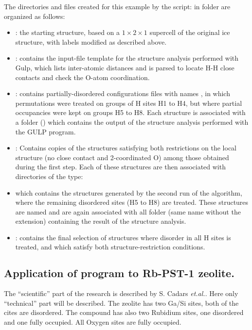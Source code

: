\documentclass[a4paper,10pt]{article}
\begin{document}
The directories and files created for this example by the script:  in folder  are organized as follows:
\begin{itemize}
 \item {}: the starting structure, based on a $1\times2\times1$ supercell of the original ice  structure, with labels modified as described above.
 \item {}: contains the input-file template for the structure analysis performed with Gulp, which lists inter-atomic distances and is parsed to locate H-H close contacts and check the O-atom coordination.
 \item {}: contains partially-disordered configurations files with names , in which permutations were treated on groups of H sites H1 to H4, but where partial occupancies were kept on groups H5 to H8. Each structure is associated with a folder () which contains the output of the structure analysis performed with the GULP program.
 \item {}: Contains copies of the structures satisfying both restrictions on the local structure (no  close contact and 2-coordinated O) among those obtained during the first step. Each of these structures are then associated with directories of the type:
 \item {} which contains the structures generated by the second run of the algorithm, where the remaining disordered sites (H5 to H8) are treated. These structures are named  and are again associated with all folder (same name without the extension) containing the result of the structure analysis.  
 \item {}: contains the final selection of structures where disorder in all H sites is treated, and which satisfy both structure-restriction conditions.
\end{itemize}

\subsection*{Application of \sups{} program to Rb-PST-1 zeolite.}

The ``scientific'' part of the research is described by S. Cadars \textit{et.al.}\cite{Rb-PST-1}. Here only ``technical'' part will be described. The zeolite has two Ga/Si sites, both of the cites are disordered. The compound has also two Rubidium sites, one disordered and one fully occupied. All Oxygen sites are fully occupied.  
\end{document}
